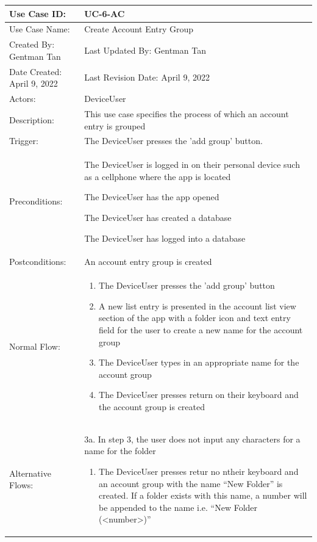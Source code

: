 \documentclass[stu]{apa7}
\newcommand{\nextitem}{\par\hspace*{\labelsep}\textbullet\hspace*{\labelsep}}
\newcommand{\nextitemblank}{\par\hspace*{\labelsep}\hspace*{\labelsep}}
\begin{document}
\scriptsize{\begin{xltabular}{\textwidth}{|l|X|}
  \hline Use Case ID: & UC-6-AC \\ \hline

  Use Case Name: & Create Account Entry Group \\ \hline

  Created By: Gentman Tan & Last Updated By: Gentman Tan\\ \hline

  Date Created: April 9, 2022 & Last Revision Date: April 9, 2022 \\ \hline

  Actors: & \nextitem DeviceUser \\ \hline

  Description: & This use case specifies the process of which an account entry is grouped \\ \hline

  Trigger: & The DeviceUser presses the 'add group' button. \\ \hline

  Preconditions: & \nextitem The DeviceUser is logged in on their personal device such as a cellphone where the app is located \nextitem The DeviceUser has the app opened \nextitem The DeviceUser has created a database \nextitem The DeviceUser has logged into a database \\ \hline

  Postconditions: & \nextitem An account entry group is created \\ \hline

  Normal Flow: &
    \begin{enumerate}
            \item The DeviceUser presses the 'add group' button
            \item A new list entry is presented in the account list view section of the app with a folder icon and text entry field for the user to create a new name for the account group
            \item The DeviceUser types in an appropriate name for the account group
            \item The DeviceUser presses return on their keyboard and the account group is created
    \end{enumerate} \\ \hline

  Alternative Flows: &
                       \nextitemblank 3a. In step 3, the user does not input any characters for a name for the folder
                       \begin{enumerate}
                               \item The DeviceUser presses retur no ntheir keyboard and an account group with the name ``New Folder'' is created. If a folder exists with this name, a number will be appended to the name i.e. ``New Folder (<number>)''
                       \end{enumerate}
              \\ \hline


\end{xltabular}}
\end{document}
